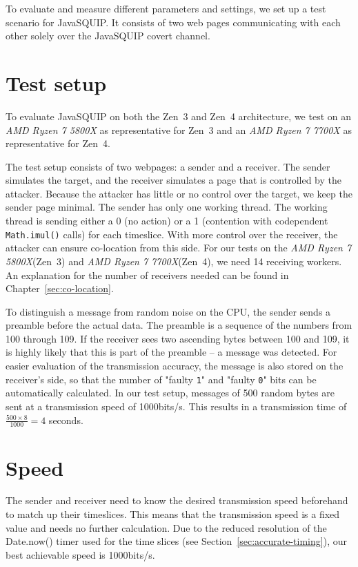 \documentclass[11pt,
  titlepage=false,
  parskip=half,      %
]{scrreprt}
\begin{document}
To evaluate and measure different parameters and settings, we set up a test scenario for JavaSQUIP.
It consists of two web pages communicating with each other solely over the JavaSQUIP covert channel.

\section {Test setup}
\label{sec:testsetup}
To evaluate JavaSQUIP on both the Zen~3 and Zen~4 architecture,
we test on an \textit{AMD Ryzen 7 5800X} as representative for Zen~3 and an \textit{AMD Ryzen 7 7700X} as representative for Zen~4.

The test setup consists of two webpages: a sender and a receiver.
The sender simulates the target, and the receiver simulates a page that is controlled by the attacker.
Because the attacker has little or no control over the target, we keep the sender page minimal.
The sender has only one working thread.
The working thread is sending either a 0 (no action) or a 1 (contention with codependent \texttt{Math.imul()} calls) for each timeslice.
With more control over the receiver, the attacker can ensure co-location from this side.
For our tests on the \textit{AMD Ryzen 7 5800X}(Zen~3) and \textit{AMD Ryzen 7 7700X}(Zen~4), we need 14 receiving workers.
An explanation for the number of receivers needed can be found in Chapter~\ref{sec:co-location}.

To distinguish a message from random noise on the CPU, the sender sends a preamble before the actual data.
The preamble is a sequence of the numbers from 100 through 109.
If the receiver sees two ascending bytes between 100 and 109, it is highly likely that this is part of the preamble --
a message was detected.
For easier evaluation of the transmission accuracy, the message is also stored on the receiver's side,
so that the number of "faulty \texttt{1}" and "faulty \texttt{0}" bits can be automatically calculated.
In our test setup, messages of 500 random bytes are sent at a transmission speed of 1000bits/s.
This results in a transmission time of $\frac{500 \times 8}{1000} = 4$ seconds.

\section{Speed}
The sender and receiver need to know the desired transmission speed beforehand to match up their timeslices.
This means that the transmission speed is a fixed value and needs no further calculation.
Due to the reduced resolution of the Date.now() timer used for the time slices (see Section~\ref{sec:accurate-timing}),
our best achievable speed is 1000bits/s.
\end{document}
